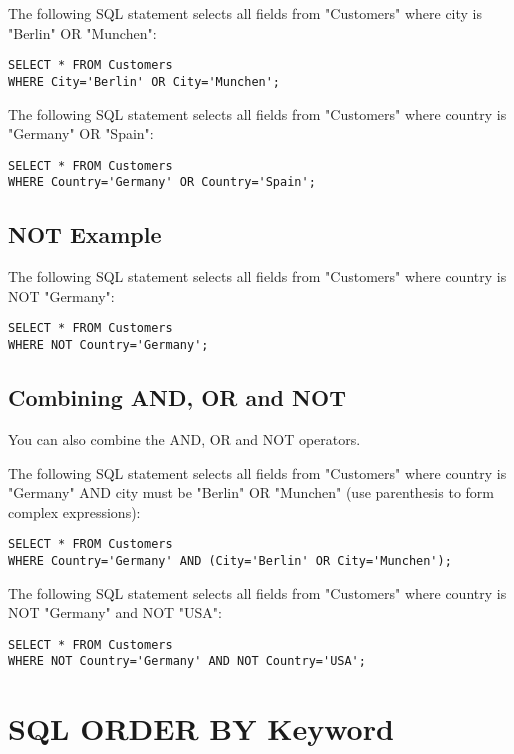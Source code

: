 \documentclass[a4paper,12pt]{article}
\begin{document}
The following SQL statement selects all fields from "Customers" where city is "Berlin" OR "Munchen":

\begin{lstlisting}
SELECT * FROM Customers
WHERE City='Berlin' OR City='Munchen';
\end{lstlisting}


The following SQL statement selects all fields from "Customers" where country is "Germany" OR "Spain":

\begin{lstlisting}
SELECT * FROM Customers
WHERE Country='Germany' OR Country='Spain';
\end{lstlisting}



\subsection{NOT Example}

The following SQL statement selects all fields from "Customers" where country is NOT "Germany":

\begin{lstlisting}
SELECT * FROM Customers
WHERE NOT Country='Germany';
\end{lstlisting}



\subsection{Combining AND, OR and NOT}

You can also combine the AND, OR and NOT operators.

The following SQL statement selects all fields from "Customers" where country is "Germany" AND city must be "Berlin" OR "Munchen" (use parenthesis to form complex expressions):


\begin{lstlisting}
SELECT * FROM Customers
WHERE Country='Germany' AND (City='Berlin' OR City='Munchen');
\end{lstlisting}


The following SQL statement selects all fields from "Customers" where country is NOT "Germany" and NOT "USA":

\begin{lstlisting}
SELECT * FROM Customers
WHERE NOT Country='Germany' AND NOT Country='USA';
\end{lstlisting}


\section{SQL ORDER BY Keyword}
\end{document}

